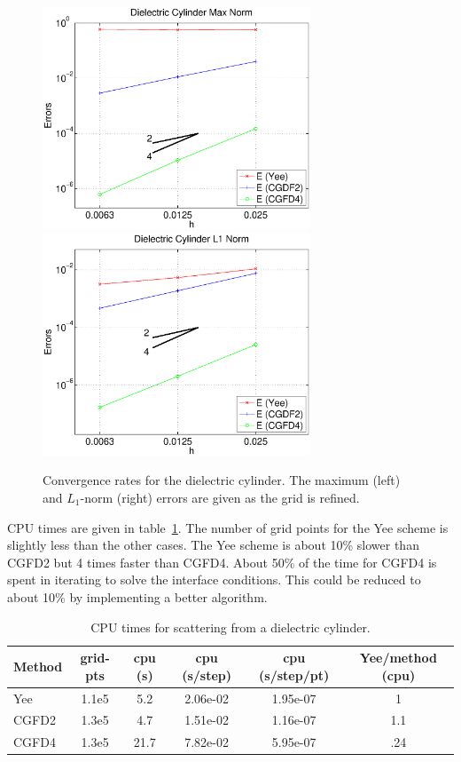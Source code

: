 \documentclass[11pt]{article}
\begin{document}
\begin{figure}[hbt]
\begin{center}\small
\includegraphics[width=8cm]{dielectricCyl/dielectricCylConvergenceRatesMaxNorm.eps}
\includegraphics[width=8cm]{dielectricCyl/dielectricCylConvergenceRatesL1Norm.eps}
%
\caption{Convergence rates for the dielectric cylinder.  
  The maximum (left) and $L_1$-norm (right) errors are given as the grid is refined.}
\label{fig:dielectricCylConvergenceRatesMaxNorm}
\end{center}
\end{figure}

CPU times are given in table~\ref{tab:dielectricCylCPU}. The number of grid points for the 
Yee scheme is slightly less than the other cases. The Yee scheme is about 10\% slower than
CGFD2 but 4 times faster than CGFD4. About 50\% of the time for CGFD4 is spent in iterating
to solve the interface conditions. This could be reduced to about 10\% by implementing a better algorithm.

\begin{table}[hbt]
\begin{center}
\begin{tabular}{|l|c|c|c|c|c|}\hline
Method  & grid-pts  & cpu (s)      & cpu (s/step) & cpu (s/step/pt) &  Yee/method (cpu) \\ \hline
Yee     &  1.1e5    &   5.2        &  2.06e-02    &  1.95e-07     &     1    \\
CGFD2   &  1.3e5    &    4.7       &  1.51e-02    &  1.16e-07     &     1.1   \\
CGFD4   &  1.3e5    &   21.7       &  7.82e-02    &  5.95e-07     &     .24  \\ \hline
\end{tabular}
\end{center}
\caption{ CPU times for scattering from a dielectric cylinder.}\label{tab:dielectricCylCPU}
\end{table}
\end{document}
